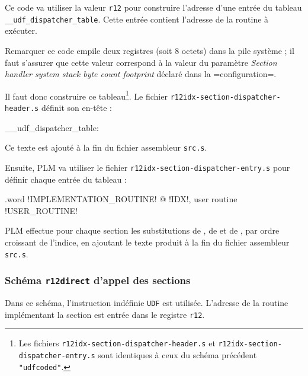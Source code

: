 Ce code va utiliser la valeur \texttt{r12} pour construire l'adresse d'une entrée du tableau \texttt{\_\_udf\_dispatcher\_table}. Cette entrée contient l'adresse de la routine à exécuter.

Remarquer ce code empile deux registres (soit 8 octets) dans la pile système ; il faut s'assurer que cette valeur correspond à la valeur du paramètre \emph{Section handler system stack byte count footprint} déclaré dans la \plm=configuration=.

Il faut donc construire ce tableau\footnote{Les fichiers \texttt{r12idx-section-dispatcher-header.s} et \texttt{r12idx-section-dispatcher-entry.s} sont identiques à ceux du schéma précédent \texttt{"udfcoded"}.}. Le fichier \texttt{r12idx-section-dispatcher-header.s} définit son en-tête :

\begin{SHELL}\small
\_\_udf\_dispatcher\_table:
\end{SHELL}

Ce texte est ajouté à la fin du fichier assembleur \texttt{src.s}.

Ensuite, PLM va utiliser le fichier \texttt{r12idx-section-dispatcher-entry.s} pour définir chaque entrée du tableau :
\begin{SHELL}\small
\hspace*{1.2em}.word !IMPLEMENTATION\_ROUTINE! @ !IDX!, user routine !USER\_ROUTINE!

\end{SHELL}

PLM effectue pour chaque section les substitutions de , de  et de , par ordre croissant de l'indice, en ajoutant le texte produit à la fin du fichier assembleur \texttt{src.s}.











\subsubsection{Schéma \texttt{r12direct} d'appel des sections}

Dans ce schéma, l'instruction indéfinie \texttt{UDF} est utilisée. L'adresse de la routine implémentant la section est entrée dans le registre \texttt{r12}.


